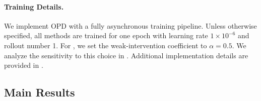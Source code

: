 \paragraph{Training Details.}
We implement OPD with a fully asynchronous training pipeline. 
%
Unless otherwise specified, all methods are trained for one epoch with learning rate $1\times10^{-6}$ and rollout number 1. 
%
For \ours, we set the weak-intervention coefficient to $\alpha=0.5$. 
%
We analyze the sensitivity to this choice in . 
%
Additional implementation details are provided in .
%


\subsection{Main Results}
\label{sec:result_analysis}
%
